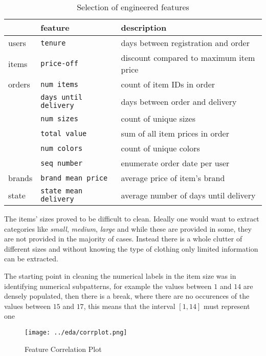 \begin{table}
\centering
\caption{Selection of engineered features}
\tiny
\label{features-tab}
\begin{tabular}{@{}lll@{}}
       & feature             & description                           \\ \midrule
users  & \texttt{tenure}              & days between registration and order        \\
items  & \texttt{price-off}           & discount compared to maximum item price    \\
orders & \texttt{num items}           & count of item IDs in order                 \\
       & \texttt{days until delivery} & days between order and delivery            \\
       & \texttt{num sizes}           & count of unique sizes                      \\
       & \texttt{total value}         & sum of all item prices in order            \\
       & \texttt{num colors}          & count of unique colors                     \\
       & \texttt{seq number}          & enumerate order date per user              \\
brands & \texttt{brand mean price}    & average price of item's brand              \\
state  & \texttt{state mean delivery} & average number of days until delivery
\end{tabular}
\end{table}

The items' sizes proved to be difficult to clean. Ideally one would want to extract categories like \textit{small}, \textit{medium}, \textit{large} and while these are provided in some, they are not provided in the majority of cases. Instead there is a whole clutter of different sizes and without knowing the type of clothing only limited information can be extracted.

The starting point in cleaning the numerical labels in the item size was in identifying numerical subpatterns, for example the values between $1$ and $14$ are densely populated, then there is a break, where there are no occurences of the values between $15$ and $17$, this means that the interval $[1, 14]$ must represent one {\par}


\begin{wrapfigure}[20]{r}[10pt]{7.1cm}
\centering
\caption{Feature Correlation Plot}
\label{corrplot}
\texttt{[image: ../eda/corrplot.png]}
\end{wrapfigure}

